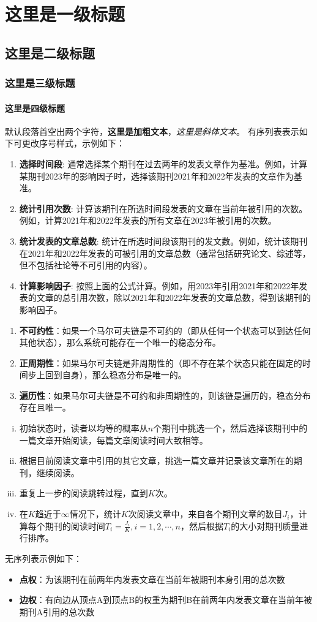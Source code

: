 \setcounter{chapter}{6}
\chapter{这里是一级标题}
\section{这里是二级标题}
\subsection{这里是三级标题}
\subsubsection{这里是四级标题}
默认段落首空出两个字符，\textbf{这里是加粗文本}，\textit{这里是斜体文本}。
有序列表表示如下可更改序号样式，示例如下：
\begin{enumerate}[(1)]
    \item \textbf{选择时间段}: 通常选择某个期刊在过去两年的发表文章作为基准。例如，计算某期刊2023年的影响因子时，选择该期刊2021年和2022年发表的文章作为基准。
    \item \textbf{统计引用次数}: 计算该期刊在所选时间段发表的文章在当前年被引用的次数。例如，计算2021年和2022年发表的所有文章在2023年被引用的次数。
    \item \textbf{统计发表的文章总数}: 统计在所选时间段该期刊的发文数。例如，统计该期刊在2021年和2022年发表的可被引用的文章总数（通常包括研究论文、综述等，但不包括社论等不可引用的内容）。
    \item \textbf{计算影响因子}: 按照上面的公式计算。例如，用2023年引用2021年和2022年发表的文章的总引用次数，除以2021年和2022年发表的文章总数，得到该期刊的影响因子。
\end{enumerate}
\begin{enumerate}
    \item \textbf{不可约性}：如果一个马尔可夫链是不可约的（即从任何一个状态可以到达任何其他状态），那么系统可能存在一个唯一的稳态分布。
    \item \textbf{正周期性}：如果马尔可夫链是非周期性的（即不存在某个状态只能在固定的时间步上回到自身），那么稳态分布是唯一的。
    \item  \textbf{遍历性}：如果马尔可夫链是不可约和非周期性的，则该链是遍历的，稳态分布存在且唯一。
\end{enumerate}
\begin{enumerate}[i)]
    \item 初始状态时，读者以均等的概率从$n$个期刊中挑选一个，然后选择该期刊中的一篇文章开始阅读，每篇文章阅读时间大致相等。
    \item 根据目前阅读文章中引用的其它文章，挑选一篇文章并记录该文章所在的期刊，继续阅读。
    \item 重复上一步的阅读跳转过程，直到$K$次。
    \item 在$K$趋近于$\infty$情况下，统计$K$次阅读文章中，来自各个期刊文章的数目$J_i$，计算每个期刊的阅读时间$T_i=\frac{J_i}{K}, i=1,2,\cdots,n$，然后根据$T_i$的大小对期刊质量进行排序。
\end{enumerate}
无序列表示例如下：
\begin{itemize}
    \item \textbf{点权}：为该期刊在前两年内发表文章在当前年被期刊本身引用的总次数
    \item \textbf{边权}：有向边从顶点A到顶点B的权重为期刊B在前两年内发表文章在当前年被期刊A引用的总次数
\end{itemize}